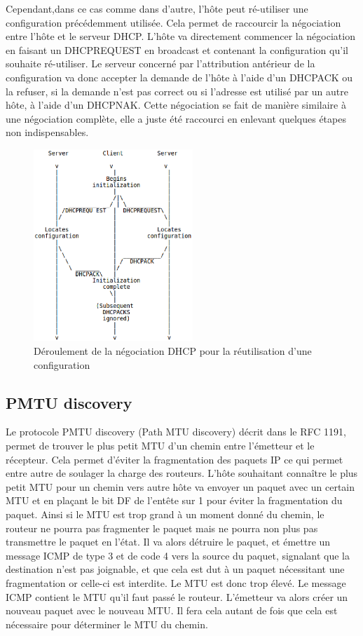 \smallbreak
Cependant,dans ce cas comme dans d'autre, l'hôte peut ré-utiliser une
configuration précédemment utilisée. Cela permet de raccourcir la négociation
entre l'hôte et le serveur DHCP. L'hôte va directement commencer la négociation
en faisant un DHCPREQUEST en broadcast et contenant la configuration qu'il
souhaite ré-utiliser. Le serveur concerné par l'attribution antérieur de la
configuration va donc accepter la demande de l'hôte à l'aide d'un DHCPACK ou la
refuser, si la demande n'est pas correct ou si l'adresse est utilisé par un
autre hôte, à l'aide d'un DHCPNAK.  Cette négociation se fait de manière
similaire à une négociation complète, elle a juste été raccourci en enlevant
quelques étapes non indispensables.

\begin{figure}[h]
\centering
\includegraphics[width=6cm]{./pics/timeline_dhcp_reuse_add.eps}
\caption{Déroulement de la négociation DHCP pour la réutilisation d'une configuration}
\label{fig:timelinedhcpreuseadd}
\end{figure}


\subsection{PMTU discovery}
Le protocole PMTU discovery (Path MTU discovery) décrit dans le RFC
1191\cite{url-RFC-PMTU}, permet de trouver le plus petit MTU d'un chemin entre
l'émetteur et le récepteur. Cela permet d'éviter la fragmentation des paquets
IP ce qui permet entre autre de soulager la charge des routeurs.  L'hôte
souhaitant connaître le plus petit MTU pour un chemin vers autre hôte va
envoyer un paquet avec un certain MTU et en plaçant le bit DF de l'entête sur 1
pour éviter la fragmentation du paquet. Ainsi si le MTU est trop grand à un
moment donné du chemin, le routeur ne pourra pas fragmenter le paquet mais ne
pourra non plus pas transmettre le paquet en l'état. Il va alors détruire le
paquet, et émettre un message ICMP de type 3 et de code 4 vers la source du
paquet, signalant que la destination n'est pas joignable, et que cela est dut à
un paquet nécessitant une fragmentation or celle-ci est interdite. Le MTU est
donc trop élevé. Le message ICMP contient le MTU qu'il faut passé le routeur.
L'émetteur va alors créer un nouveau paquet avec le nouveau MTU. Il fera cela
autant de fois que cela est nécessaire pour déterminer le MTU du chemin.

